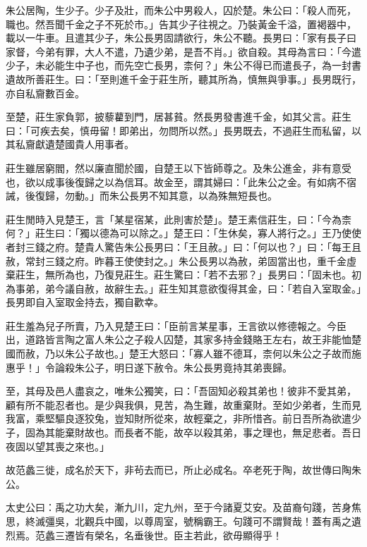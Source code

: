 \begin{pinyinscope}
朱公居陶，生少子。少子及壯，而朱公中男殺人，囚於楚。朱公曰：「殺人而死，職也。然吾聞千金之子不死於市。」告其少子往視之。乃裝黃金千溢，置褐器中，載以一牛車。且遣其少子，朱公長男固請欲行，朱公不聽。長男曰：「家有長子曰家督，今弟有罪，大人不遣，乃遺少弟，是吾不肖。」欲自殺。其母為言曰：「今遣少子，未必能生中子也，而先空亡長男，柰何？」朱公不得已而遣長子，為一封書遺故所善莊生。曰：「至則進千金于莊生所，聽其所為，慎無與爭事。」長男既行，亦自私齎數百金。

至楚，莊生家負郭，披藜藋到門，居甚貧。然長男發書進千金，如其父言。莊生曰：「可疾去矣，慎毋留！即弟出，勿問所以然。」長男既去，不過莊生而私留，以其私齎獻遺楚國貴人用事者。

莊生雖居窮閻，然以廉直聞於國，自楚王以下皆師尊之。及朱公進金，非有意受也，欲以成事後復歸之以為信耳。故金至，謂其婦曰：「此朱公之金。有如病不宿誡，後復歸，勿動。」而朱公長男不知其意，以為殊無短長也。

莊生閒時入見楚王，言「某星宿某，此則害於楚」。楚王素信莊生，曰：「今為柰何？」莊生曰：「獨以德為可以除之。」楚王曰：「生休矣，寡人將行之。」王乃使使者封三錢之府。楚貴人驚告朱公長男曰：「王且赦。」曰：「何以也？」曰：「每王且赦，常封三錢之府。昨暮王使使封之。」朱公長男以為赦，弟固當出也，重千金虛棄莊生，無所為也，乃復見莊生。莊生驚曰：「若不去邪？」長男曰：「固未也。初為事弟，弟今議自赦，故辭生去。」莊生知其意欲復得其金，曰：「若自入室取金。」長男即自入室取金持去，獨自歡幸。

莊生羞為兒子所賣，乃入見楚王曰：「臣前言某星事，王言欲以修德報之。今臣出，道路皆言陶之富人朱公之子殺人囚楚，其家多持金錢賂王左右，故王非能恤楚國而赦，乃以朱公子故也。」楚王大怒曰：「寡人雖不德耳，柰何以朱公之子故而施惠乎！」令論殺朱公子，明日遂下赦令。朱公長男竟持其弟喪歸。

至，其母及邑人盡哀之，唯朱公獨笑，曰：「吾固知必殺其弟也！彼非不愛其弟，顧有所不能忍者也。是少與我俱，見苦，為生難，故重棄財。至如少弟者，生而見我富，乘堅驅良逐狡兔，豈知財所從來，故輕棄之，非所惜吝。前日吾所為欲遣少子，固為其能棄財故也。而長者不能，故卒以殺其弟，事之理也，無足悲者。吾日夜固以望其喪之來也。」

故范蠡三徙，成名於天下，非茍去而已，所止必成名。卒老死于陶，故世傳曰陶朱公。

太史公曰：禹之功大矣，漸九川，定九州，至于今諸夏艾安。及苗裔句踐，苦身焦思，終滅彊吳，北觀兵中國，以尊周室，號稱霸王。句踐可不謂賢哉！蓋有禹之遺烈焉。范蠡三遷皆有榮名，名垂後世。臣主若此，欲毋顯得乎！


\end{pinyinscope}